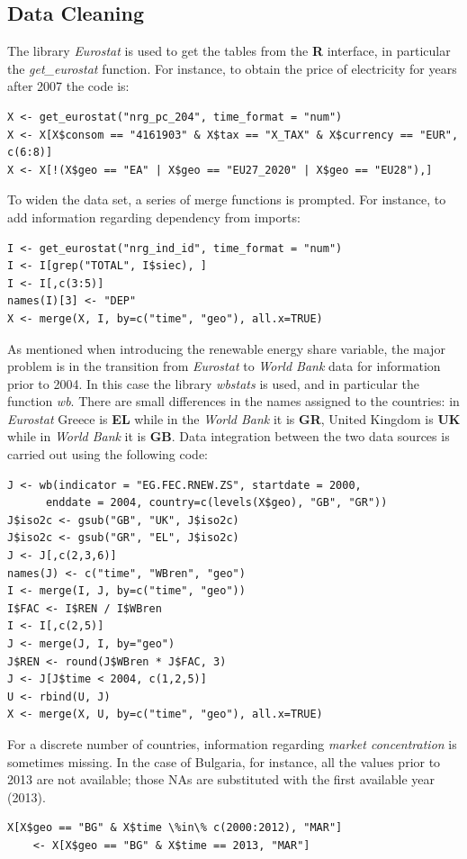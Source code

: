 \documentclass{book}
\begin{document}
\begin{appendices}
\chapter*{Data Cleaning}
The library \textit{Eurostat} is used to get the tables from the \textbf{R} interface, in particular the \textit{get\_eurostat} function. For instance, to obtain the price of electricity for years after 2007 the code is:

\begin{verbatim}
X <- get_eurostat("nrg_pc_204", time_format = "num")
X <- X[X$consom == "4161903" & X$tax == "X_TAX" & X$currency == "EUR", c(6:8)]
X <- X[!(X$geo == "EA" | X$geo == "EU27_2020" | X$geo == "EU28"),]
\end{verbatim}

\noindent To widen the data set, a series of merge functions is prompted. For instance, to add information regarding dependency from imports:

\begin{verbatim}
I <- get_eurostat("nrg_ind_id", time_format = "num")
I <- I[grep("TOTAL", I$siec), ]
I <- I[,c(3:5)]
names(I)[3] <- "DEP"
X <- merge(X, I, by=c("time", "geo"), all.x=TRUE)
\end{verbatim}

\noindent As mentioned when introducing the renewable energy share variable, the major problem is in the transition from \textit{Eurostat} to \textit{World Bank} data for information prior to 2004. In this case the library \textit{wbstats} is used, and in particular the function \textit{wb}. There are small differences in the names assigned to the countries: in \textit{Eurostat} Greece is \textbf{EL} while in the \textit{World Bank} it is \textbf{GR}, United Kingdom is \textbf{UK} while in \textit{World Bank} it is \textbf{GB}. Data integration between the two data sources is carried out using the following code:

\begin{verbatim}
J <- wb(indicator = "EG.FEC.RNEW.ZS", startdate = 2000, 
	  enddate = 2004, country=c(levels(X$geo), "GB", "GR"))
J$iso2c <- gsub("GB", "UK", J$iso2c)
J$iso2c <- gsub("GR", "EL", J$iso2c)
J <- J[,c(2,3,6)]
names(J) <- c("time", "WBren", "geo")
I <- merge(I, J, by=c("time", "geo"))
I$FAC <- I$REN / I$WBren
I <- I[,c(2,5)]
J <- merge(J, I, by="geo")
J$REN <- round(J$WBren * J$FAC, 3)
J <- J[J$time < 2004, c(1,2,5)]
U <- rbind(U, J)
X <- merge(X, U, by=c("time", "geo"), all.x=TRUE)
\end{verbatim}

\end{appendices}

\noindent For a discrete number of countries, information regarding \textit{market concentration} is sometimes missing. In the case of Bulgaria, for instance, all the values prior to 2013 are not available; those NAs are substituted with the first available year (2013).

\begin{verbatim}
X[X$geo == "BG" & X$time \%in\% c(2000:2012), "MAR"] 
	<- X[X$geo == "BG" & X$time == 2013, "MAR"]
\end{verbatim}

{}

\end{document}
